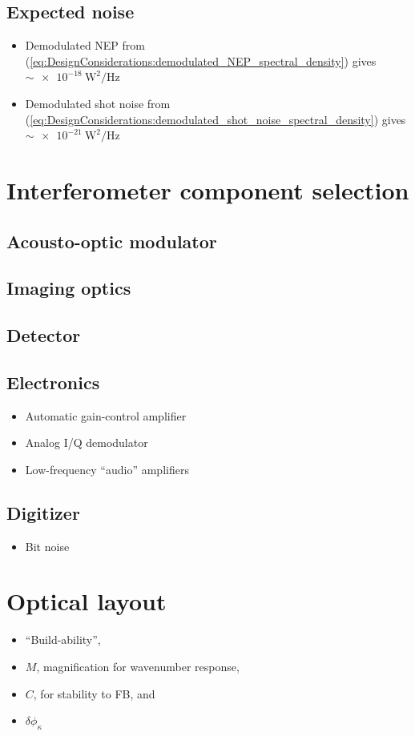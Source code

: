 \subsection{Expected noise}

\begin{itemize}
  \item Demodulated NEP from
    (\ref{eq:DesignConsiderations:demodulated_NEP_spectral_density}) gives
    $\sim \SI{e-18}{\watt\squared\per\hertz}$
  \item Demodulated shot noise from
    (\ref{eq:DesignConsiderations:demodulated_shot_noise_spectral_density})
    gives $\sim \SI{e-21}{\watt\squared\per\hertz}$
\end{itemize}


\section{Interferometer component selection}
\subsection{Acousto-optic modulator}
\subsection{Imaging optics}
\subsection{Detector}
\subsection{Electronics}
\begin{itemize}
  \item Automatic gain-control amplifier
  \item Analog I/Q demodulator
  \item Low-frequency ``audio'' amplifiers
\end{itemize}
\subsection{Digitizer}
\begin{itemize}
  \item Bit noise
\end{itemize}


\section{Optical layout}
\begin{itemize}
  \item ``Build-ability'',
  \item $M$, magnification for wavenumber response,
  \item $C$, for stability to FB, and
  \item $\delta \phi_{\kappa}$
\end{itemize}


